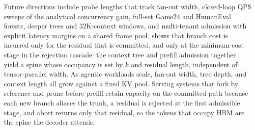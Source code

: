 Future directions include probe lengths that track fan-out width, closed-loop QPS sweeps of the analytical concurrency gain, full-set Game24 and HumanEval forests, deeper trees and $32$K-context windows, and multi-tenant admission with explicit latency margins on a shared frame pool.
\sys shows that branch cost is incurred only for the residual that is committed, and only at the minimum-cost stage in the rejection cascade: the context tree and prefill admission together yield a spine whose occupancy is set by $k$ and residual length, independent of tensor-parallel width.
As agentic workloads scale, fan-out width, tree depth, and context length all grow against a fixed KV pool.
Serving systems that fork by reference and prune before prefill retain capacity on the committed path because each new branch aliases the trunk, a residual is rejected at the first admissible stage, and abort returns only that residual, so the tokens that occupy HBM are the spine the decoder attends.
